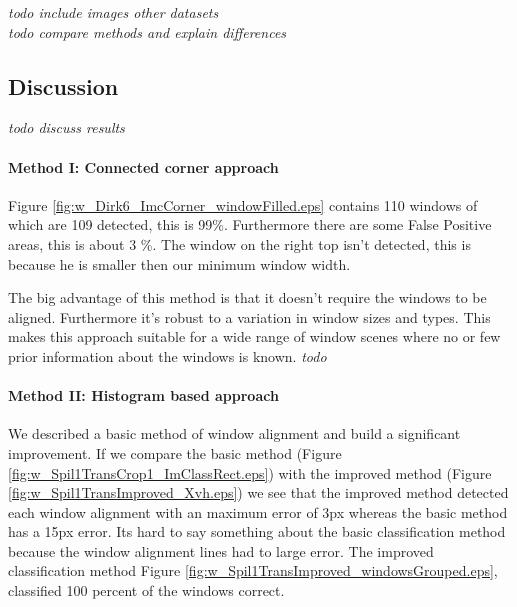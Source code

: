



\emph{todo include images other datasets} \\
\emph{todo compare methods and explain differences}


\subsection{Discussion}  %
\emph{ todo discuss results }

\paragraph{Method I: Connected corner approach} 
Figure \ref{fig:w_Dirk6_ImcCorner_windowFilled.eps} contains 110 windows of which
are 109 detected, this is 99\%. Furthermore there are some False Positive areas,
this is about 3 \%.  The window on the right top isn't detected, this is because
he is smaller then our minimum window width.

The big advantage of this method is that it doesn't require the windows to be aligned.
Furthermore it's robust to a variation in window sizes and types. This makes
this approach suitable for a wide range of window scenes where no or few prior
information about the windows is known.
\emph{todo}


\paragraph{Method II: Histogram based approach} 
We described a basic method of window alignment and build a significant improvement.
If we compare the basic method (Figure \ref{fig:w_Spil1TransCrop1_ImClassRect.eps})
with the improved method (Figure \ref{fig:w_Spil1TransImproved_Xvh.eps}) we see that the improved method detected each window alignment with an maximum error of 3px whereas the basic method has a 15px error.
Its hard to say something about the basic classification method because the window alignment lines had to large error.
The improved classification method Figure \ref{fig:w_Spil1TransImproved_windowsGrouped.eps}, classified 100 percent of the windows correct.


